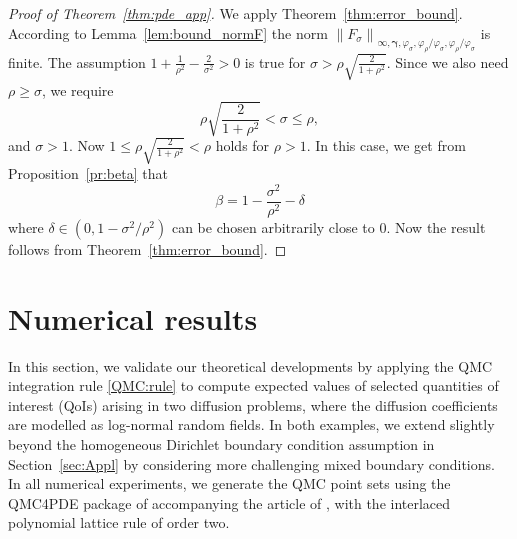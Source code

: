 \documentclass[namedate,webpdf,imanum]{ima-authoring-arxiv}%
\theoremstyle{thmstyletwo}%
\numberwithin{equation}{section}
\newcommand{\bsgamma}{\boldsymbol{\gamma}}
\begin{document}
\begin{proof}[Proof of Theorem~\ref{thm:pde_app}]
We apply Theorem~\ref{thm:error_bound}. According to Lemma~\ref{lem:bound_normF} the norm $\left\| F_{\sigma} \right\|_{\infty, \bsgamma,\varphi_\sigma,\varphi_\rho/\varphi_\sigma,\varphi_\rho / \varphi_\sigma}$ is finite. The assumption $1 + \frac{1}{\rho^2} - \frac{2}{\sigma^2} > 0$ is true for $\sigma > \rho \sqrt{\frac{2}{1+\rho^2}}$. Since we also need $\rho \ge \sigma$, we require
\begin{equation}\label{ineq_sig_rho}
\rho \sqrt{\frac{2}{1+\rho^2}} < \sigma \le \rho,
\end{equation}
and $\sigma  > 1$. Now $1 \le \rho \sqrt{\frac{2}{1+\rho^2}} < \rho$ holds for $\rho > 1$. In this case, we get from Proposition~\ref{pr:beta} that $$\beta = 1 - \frac{\sigma^2}{\rho^2}-\delta$$ where $\delta \in (0,1-\sigma^2/\rho^2)$ can be chosen arbitrarily close to 0. Now the result follows from Theorem~\ref{thm:error_bound}.
\end{proof}



\section{Numerical results}\label{sec:numerics}

In this section, we validate our theoretical developments by applying the QMC integration rule \eqref{QMC:rule} to compute expected values of selected quantities of interest (QoIs) arising in two diffusion problems, where the diffusion coefficients are modelled as log-normal random fields. In both examples, we extend slightly beyond the homogeneous Dirichlet boundary condition assumption in Section~\ref{sec:Appl} by considering more challenging mixed boundary conditions. In all numerical experiments, we generate the QMC point sets using the QMC4PDE package of \citeauthor{QMC4PDE} accompanying the article of \cite{KN16}, with the interlaced polynomial lattice rule of order two. 
\end{document}
